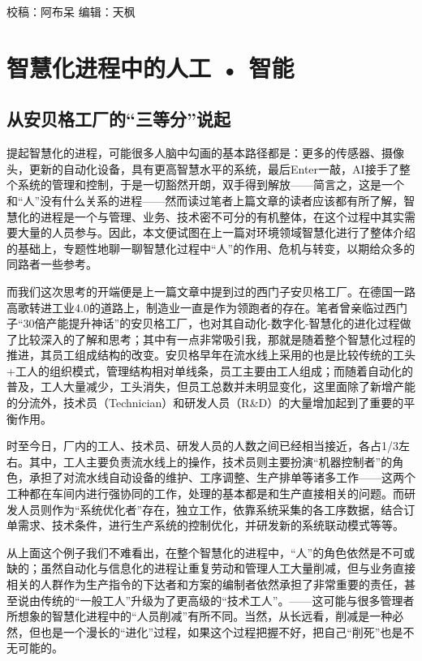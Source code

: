 \documentclass[]{book}
\begin{document}
校稿：阿布呆
编辑：天枫

\hypertarget{ux667aux6167ux5316ux8fdbux7a0bux4e2dux7684ux4ebaux5de5-ux667aux80fd}{%
\section{智慧化进程中的人工 • 智能}\label{ux667aux6167ux5316ux8fdbux7a0bux4e2dux7684ux4ebaux5de5-ux667aux80fd}}

\hypertarget{ux4eceux5b89ux8d1dux683cux5de5ux5382ux7684ux4e09ux7b49ux5206ux8bf4ux8d77}{%
\subsection{从安贝格工厂的``三等分''说起}\label{ux4eceux5b89ux8d1dux683cux5de5ux5382ux7684ux4e09ux7b49ux5206ux8bf4ux8d77}}

提起智慧化的进程，可能很多人脑中勾画的基本路径都是：更多的传感器、摄像头，更新的自动化设备，具有更高智慧水平的系统，最后Enter一敲，AI接手了整个系统的管理和控制，于是一切豁然开朗，双手得到解放------简言之，这是一个和``人''没有什么关系的进程------然而读过笔者上篇文章的读者应该都有所了解，智慧化的进程是一个与管理、业务、技术密不可分的有机整体，在这个过程中其实需要大量的人员参与。因此，本文便试图在上一篇对环境领域智慧化进行了整体介绍的基础上，专题性地聊一聊智慧化过程中``人''的作用、危机与转变，以期给众多的同路者一些参考。

而我们这次思考的开端便是上一篇文章中提到过的西门子安贝格工厂。在德国一路高歌转进工业4.0的道路上，制造业一直是作为领跑者的存在。笔者曾亲临过西门子``30倍产能提升神话''的安贝格工厂，也对其自动化-数字化-智慧化的进化过程做了比较深入的了解和思考；其中有一点非常吸引我，那就是随着整个智慧化过程的推进，其员工组成结构的改变。安贝格早年在流水线上采用的也是比较传统的工头+工人的组织模式，管理结构相对单线条，员工主要由工人组成；而随着自动化的普及，工人大量减少，工头消失，但员工总数并未明显变化，这里面除了新增产能的分流外，技术员（Technician）和研发人员（R\&D）的大量增加起到了重要的平衡作用。

时至今日，厂内的工人、技术员、研发人员的人数之间已经相当接近，各占1/3左右。其中，工人主要负责流水线上的操作，技术员则主要扮演``机器控制者''的角色，承担了对流水线自动设备的维护、工序调整、生产排单等诸多工作------这两个工种都在车间内进行强协同的工作，处理的基本都是和生产直接相关的问题。而研发人员则作为``系统优化者''存在，独立工作，依靠系统采集的各工序数据，结合订单需求、技术条件，进行生产系统的控制优化，并研发新的系统联动模式等等。

从上面这个例子我们不难看出，在整个智慧化的进程中，``人''的角色依然是不可或缺的；虽然自动化与信息化的进程让重复劳动和管理人工大量削减，但与业务直接相关的人群作为生产指令的下达者和方案的编制者依然承担了非常重要的责任，甚至说由传统的``一般工人''升级为了更高级的``技术工人''。------这可能与很多管理者所想象的智慧化进程中的``人员削减''有所不同。当然，从长远看，削减是一种必然，但也是一个漫长的``进化''过程，如果这个过程把握不好，把自己``削死''也是不无可能的。
\end{document}
